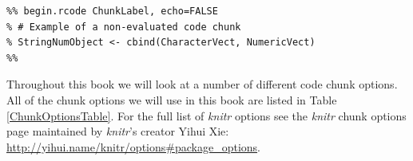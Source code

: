 \documentclass[krantz1]{krantz}
\begin{document}
\begin{knitrout}
    \color{fgcolor}
    \begin{kframe}
        \begin{verbatim}
%% begin.rcode ChunkLabel, echo=FALSE
% # Example of a non-evaluated code chunk
% StringNumObject <- cbind(CharacterVect, NumericVect)
%%
            \end{verbatim}
        \end{kframe}
\end{knitrout}

Throughout this book we will look at a number of different code chunk options. All of the chunk options we will use in this book are listed in Table \ref{ChunkOptionsTable}. For the full list of {\emph{knitr}} options see the {\emph{knitr}} chunk options page maintained by {\emph{knitr}}'s creator Yihui Xie: \url{http://yihui.name/knitr/options#package_options}.
\end{document}
